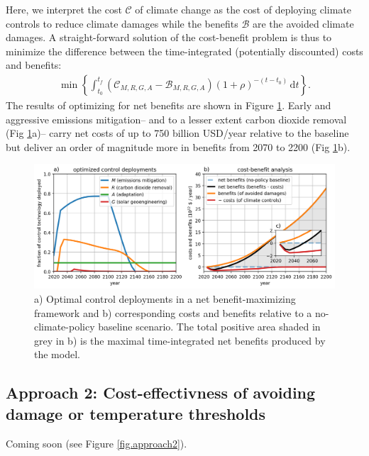\documentclass{article}
\begin{document}
Here, we interpret the cost $\mathcal{C}$ of climate change as the cost of deploying climate controls to reduce climate damages while the benefits $\mathcal{B}$ are the avoided climate damages. A straight-forward solution of the cost-benefit problem is thus to minimize the difference between the time-integrated (potentially discounted) costs and benefits:
\begin{gather}
    \min \left\{ \int_{t_{0}}^{t_{f}} 
    \left(\mathcal{C}_{M, R, G, A} - \mathcal{B}_{M, R, G, A}\right) (1 + \rho)^{-(t-t_{0})} \, \text{d}t \right\}.
\end{gather}
The results of optimizing for net benefits are shown in Figure \ref{fig.approach1}. Early and aggressive emissions mitigation– and to a lesser extent carbon dioxide removal (Fig \ref{fig.approach1}a)– carry net costs of up to 750 billion USD/year relative to the baseline but deliver an order of magnitude more in benefits from 2070 to 2200 (Fig \ref{fig.approach1}b).

\begin{figure}[htb!]
\noindent\includegraphics[width=1.0\textwidth]{figures/default-benefits_controls_and_benefits.png}
\centering
\caption{a) Optimal control deployments in a net benefit-maximizing framework and b) corresponding costs and benefits relative to a no-climate-policy baseline scenario. The total positive area shaded in grey in b) is the maximal time-integrated net benefits produced by the model.}
\label{fig.approach1}
\end{figure}

\subsection{Approach 2: Cost-effectivness of avoiding damage or temperature thresholds}\label{sec.cost-effectivness}

Coming soon (see Figure \ref{fig.approach2}).
\end{document}
